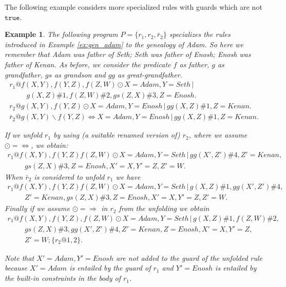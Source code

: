 \documentclass[final]{acmtrans2e}
\newtheorem{exa}[theorem]{Example}
\newenvironment{example}{\begin{exa}}{\end{exa}}
\begin{document}
The following example considers more specialized rules  with guards which are not $\texttt{true}$.

\begin{example}\label{ex:gen_adam_refined}
The following  program $P=\{r_1, r_2, \bar r_2\}$ specializes the rules introduced in Example \ref{ex:gen_adam}
to the genealogy of Adam. So here we remember that Adam was father of Seth; Seth was father
of Enosh; Enosh was father of Kenan. As before, we consider the predicate $f$ as father,
$g$ as grandfather, $gs$ as grandson and $gg$ as great-grandfather.
$$
\begin{array}{l}
r_1@f(X, Y), f(Y, Z), f(Z,W)\odot X= Adam, Y=Seth\,|\,\\
\hspace{1cm}g(X, Z)\#1,f(Z, W)\#2, gs(Z, X)\#3, Z=Enosh.\\
r_2@g(X, Y), f(Y, Z)  \odot  X=Adam, Y=Enosh\,|\, gg(X, Z)\#1, Z=Kenan.\\
\bar r_2@g(X, Y) \backslash f(Y, Z) \Leftrightarrow  X=Adam, Y=Enosh\,|\, gg(X, Z)\#1,Z=Kenan.
\end{array}
$$

If we unfold $r_1$ by using (a suitable renamed version of) $r_2$,
where we assume $\odot=\Leftrightarrow$, we obtain:
$$
\begin{array}{l}
r_1@f(X, Y),f(Y, Z)f(Z, W)\odot X=Adam, Y=Seth\,|\,gg(X', Z')\#4, Z'= Kenan, \\
\hspace{1cm}gs(Z, X)\#3, Z=Enosh, X'=X, Y'=Z, Z'=W.
\end{array}
$$
When $\bar r_2$ is considered to unfold $r_1$ we have
$$
\begin{array}{l}
r_1@f(X, Y),f(Y, Z)f(Z, W)\odot X=Adam, Y=Seth\,|\,g(X, Z)\#1,gg(X', Z')\#4,   \\
\hspace{1cm}Z'= Kenan, gs(Z, X)\#3, Z=Enosh, X'=X, Y'=Z, Z'=W.
\end{array}
$$
Finally if we assume $\odot=\Rightarrow$ in $r_2$ from the unfolding we obtain
$$
\begin{array}{l}
r_1@f(X, Y),f(Y, Z), f(Z, W)\odot X=Adam, Y=Seth\,|\,g(X, Z)\#1, f(Z, W)\#2,\\
\hspace{1cm}gs(Z, X)\#3, gg(X', Z')\#4, Z'= Kenan, Z=Enosh, X'=X, Y'=Z,\\
\hspace{1cm} Z'=W; \{r_2@1, 2\}.
\end{array}
$$

Note that  $X'=Adam, Y'=Enosh$ are not
added to the guard of the unfolded rule  because $X'=Adam$ is
entailed by the guard of $r_1$ and $Y'=Enosh$ is entailed
by the built-in constraints in the body of $r_1$.
\end{example}
\end{document}
